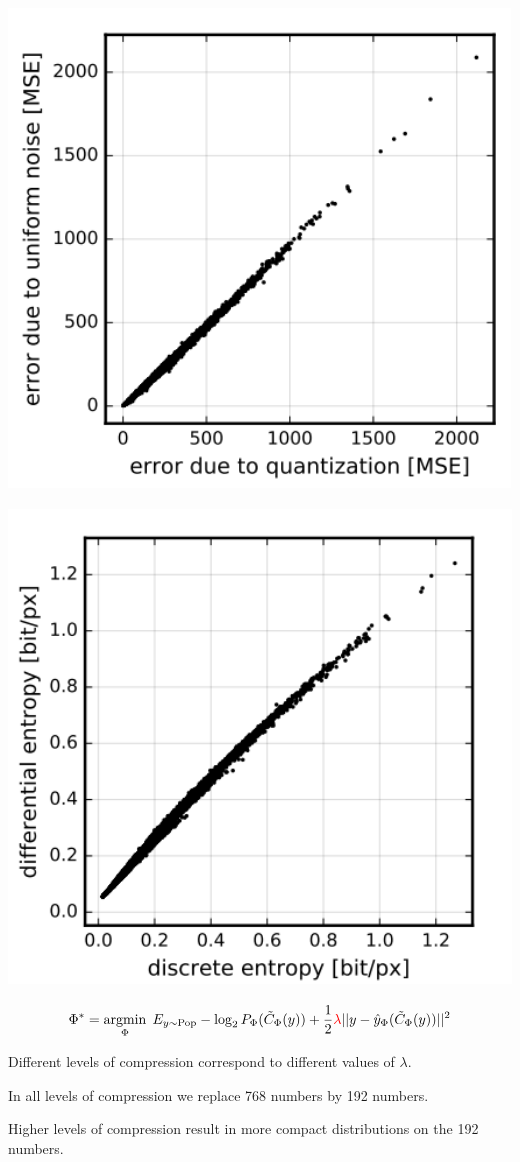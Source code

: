 {\centerline{\includegraphics[height=5in]{../images/RateDist5}}


\bigskip
\centerline{\includegraphics[height=5in]{../images/RateDist6}}


$$\Phi^* = \operatorname*{argmin}_\Phi\; E_{y \sim \mathrm{Pop}} - \log_2 P_\Phi(\tilde{C}_\Phi(y)) + \frac{1}{2}{\color{red} \lambda} ||y - \hat{y}_\Phi(\tilde{C}_\Phi(y))||^2$$

\vfill
Different levels of compression correspond to different values of $\lambda$.

\vfill
In all levels of compression we replace 768 numbers by 192 numbers.

\vfill
Higher levels of compression result in more compact distributions on the 192 numbers.

}


